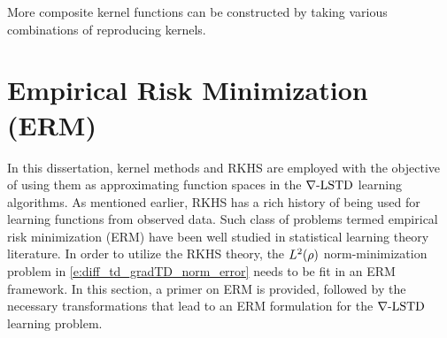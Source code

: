 More composite kernel functions can be constructed by taking various combinations of reproducing kernels. 
\section{Empirical Risk Minimization (ERM)}
\label{s:erm}
In this dissertation, kernel methods and RKHS are employed with the objective of using them as approximating function spaces in the $\nabla\text{-LSTD}$ learning algorithms. As mentioned earlier, RKHS has a rich history of being used for learning functions from observed data. Such class of problems termed empirical risk minimization (ERM) have been well studied in statistical learning theory literature. In order to utilize the RKHS theory, the $L^2(\rho)$ norm-minimization problem in \eqref{e:diff_td_gradTD_norm_error} needs to be fit in an ERM framework. In this section, a primer on ERM is provided, followed by the necessary transformations that lead to an ERM formulation for the $\nabla\text{-LSTD}$ learning problem.  

